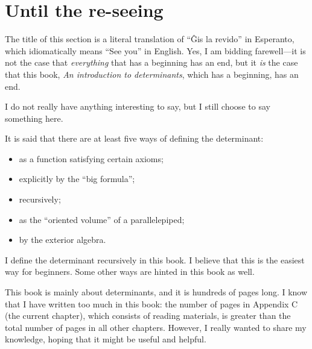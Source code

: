 \documentclass[../libro.tex]{subfiles}
\begin{document}

\section{Until the re-seeing}

\begingroup
\setlength{\parindent}{1.5em}%

\let\umathpi\pi
\renewcommand*{\pi}{\symup\umathpi}

\let\umathtau\tau
\renewcommand*{\tau}{\symup\umathtau}

The title of this section is a literal translation of
``Ĝis la revido'' in Esperanto,
which idiomatically means ``See you'' in English.
Yes, I am bidding farewell---it is not the case that
\textit{everything} that has a beginning has an end,
but it \textit{is} the case that
this book,
\textit{An introduction to determinants},
which has a beginning, has an end.

I do not really have anything interesting to say,
but I still choose to say something here.

It is said that there are at least five ways
of defining the determinant:
\begin{itemize}
    \item as a function satisfying certain axioms;
    \item explicitly by the ``big formula'';
    \item recursively;
    \item as the ``oriented volume'' of a parallelepiped;
    \item by the exterior algebra.
\end{itemize}
I define the determinant recursively in this book.
I believe that this is the easiest way for beginners.
Some other ways are hinted in this book as well.

This book is mainly about determinants,
and it is hundreds of pages long.
I know that I have written too much in this book:
the number of pages in Appendix C
(the current chapter),
which consists of reading materials,
is greater than the total number of pages in all other chapters.
However, I really wanted to share my knowledge,
hoping that it might be useful and helpful.
\end{document}
